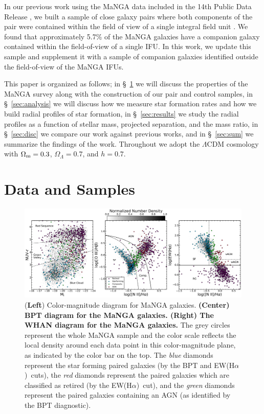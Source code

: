 \documentclass[iop,revtex4,twocolumn,apj,numberedappendix,appendixfloats]{emulateapj}
\newcommand{\ewha}{EW(H$\alpha$)}
\begin{document}
In our previous work using the MaNGA data included in the 14th Public Data Release \citep[DR14;][]{Abolfathi:2018}, we built a sample of close galaxy pairs where both components of the pair were contained within the field of view of a single integral field unit \citep[][hereafter ]{Fu:2018}. We found that approximately 5.7\% of the MaNGA galaxies have a companion galaxy contained within the field-of-view of a single IFU. In this work, we update this sample and supplement it with a sample of companion galaxies identified outside the field-of-view of the MaNGA IFUs. 

This paper is organized as follows; in \S~\ref{sec:data} we will discuss the properties of the MaNGA survey along with the construction of our pair and control samples, in \S~\ref{sec:analysis} we will discuss how we measure star formation rates and how we build radial profiles of star formation, in \S~\ref{sec:results} we study the radial profiles as a function of stellar mass, projected separation, and the mass ratio, in \S~\ref{sec:disc} we compare our work against previous works, and in \S~\ref{sec:sum} we summarize the findings of the work. 
Throughout we adopt the $\Lambda$CDM cosmology with $\Omega_{\rm m}=0.3$, $\Omega_\Lambda=0.7$, and $h=0.7$. 

\section{Data and Samples}\label{sec:data}

\begin{figure}
\centering
\includegraphics[width=\linewidth]{fig/bpt-cmd.pdf}
\caption[]{(\textbf{Left}) Color-magnitude diagram for MaNGA galaxies. \textbf{(\textbf{Center}) BPT diagram for the MaNGA galaxies. (\textbf{Right}) The WHAN diagram for the MaNGA galaxies.} The grey circles represent the whole MaNGA sample and the color scale reflects the local density around each data point in this color-magnitude plane, as indicated by the color bar on the top. The {\it blue} diamonds represent the star forming paired galaxies (by the BPT and \ewha\ cuts), the {\it red} diamonds represent the paired galaxies which are classified as retired (by the \ewha\ cut), and the {\it green} diamonds represent the paired galaxies containing an AGN (as identified by the BPT diagnostic).}
\label{fig:cmd}
\end{figure}
\end{document}

